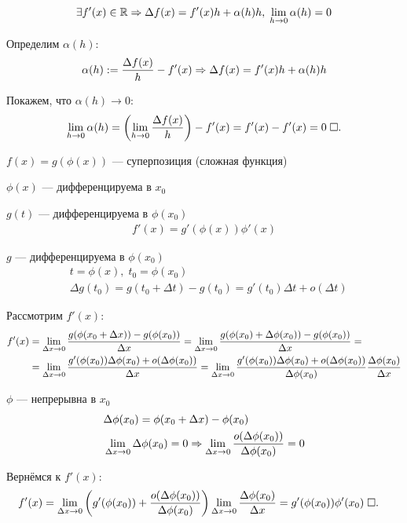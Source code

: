 \documentclass{article}
\begin{document}

\theorem
\begin{align*}
	\exists f'(x)\in\mathbb{R}\Rightarrow \Delta f(x)=f'(x)h+\alpha(h)h,\;\lim\limits_{h\to 0}\alpha(h)=0
\end{align*}

\proof

Определим $\alpha(h)$:
\begin{align*}
	\alpha(h):=\frac{\Delta f(x)}{h}-f'(x)\Rightarrow \Delta f(x) = f'(x)h+\alpha(h)h
\end{align*}

Покажем, что $\alpha(h)\to 0$:
\begin{align*}
	\lim\limits_{h\to 0}\alpha(h)=\left(\lim\limits_{h\to 0}\frac{\Delta f(x)}{h}\right)-f'(x)=f'(x)-f'(x)=0\;\square.
\end{align*}

\theorem

$f(x) = g(\phi(x))$ --- суперпозиция (сложная функция)

$\phi (x)$ --- дифференцируема в $x_0$

$g(t)$ --- дифференцируема в $\phi (x_0)$
\begin{align*}
	f'(x)=g'(\phi(x))\phi'(x)
\end{align*}

\proof

$g$ --- дифференцируема в $\phi(x_0)$
\begin{align*}
	 & t=\phi(x),\;t_0=\phi(x_0)                                               \\
	 & \Delta g(t_0) = g(t_0 + \Delta t) - g(t_0) =g'(t_0)\Delta t+o(\Delta t)
\end{align*}

Рассмотрим $f'(x)$:
\begin{align*}
	f'(x) & =\lim\limits_{\Delta x\to 0}\frac{g(\phi(x_0+\Delta x))-g(\phi(x_0))}{\Delta x}=\lim\limits_{\Delta x\to 0}\frac{g(\phi(x_0)+\Delta \phi(x_0))-g(\phi(x_0))}{\Delta x}= \\
	      & =\lim\limits_{\Delta x\to 0}\frac{g'(\phi(x_0))\Delta \phi(x_0)+o(\Delta\phi(x_0))}{\Delta x}
	=\lim\limits_{\Delta x\to 0}\frac{g'(\phi(x_0))\Delta \phi(x_0)+o(\Delta\phi(x_0))}{\Delta \phi(x_0)}\frac{\Delta\phi(x_0)}{\Delta x}
\end{align*}

$\phi$ --- непрерывна в $x_0$
\begin{align*}
	 & \Delta \phi(x_0)=\phi(x_0+\Delta x)-\phi(x_0)                                                               \\
	 & \lim\limits_{\Delta x\to 0}\Delta\phi(x_0)=0\Rightarrow \lim\limits_{\Delta x\to 0}\frac{o(\Delta\phi(x_0))}{\Delta\phi(x_0)}=0
\end{align*}

Вернёмся к $f'(x)$:
\begin{align*}
	f'(x) & =\lim\limits_{\Delta x\to 0}\left(g'(\phi(x_0))+\frac{o(\Delta\phi(x_0))}{\Delta \phi(x_0)}\right)\lim\limits_{\Delta x\to 0}\frac{\Delta\phi(x_0)}{\Delta x}=g'(\phi(x_0))\phi'(x_0)\;\square.
\end{align*}
\end{document}
